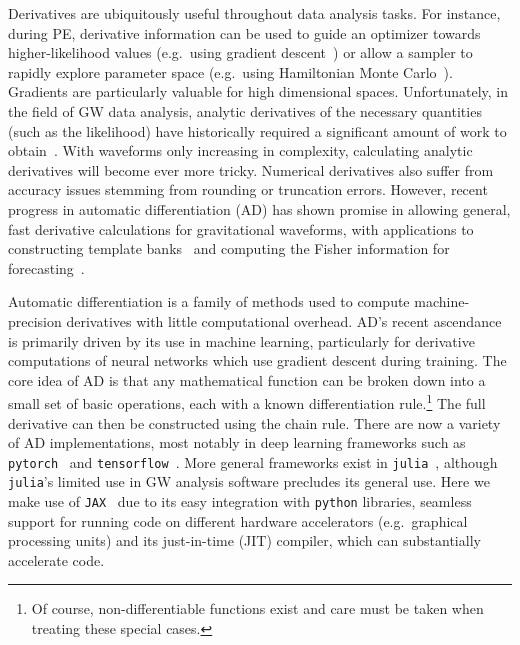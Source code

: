 \documentclass[twocolumn]{aastex631}
\newcommand{\jax}{\texttt{JAX}\xspace}
\newcommand{\kw}[1]{{\color{rb4}[KW: #1 ]}}
\newcommand{\dfm}[1]{{\color{dfm}[DFM: #1]}}
\begin{document}
Derivatives are ubiquitously useful throughout data analysis tasks.
For instance, during PE, derivative information can be used to guide an optimizer towards higher-likelihood values (e.g.\ using gradient descent~\citep{2016arXiv160904747R}) or allow a sampler to rapidly explore parameter space (e.g.\ using Hamiltonian Monte Carlo~\citep{2011hmcm.book..113N,2017arXiv170102434B}).
Gradients are particularly valuable for high dimensional spaces.
Unfortunately, in the field of GW data analysis, analytic derivatives of the necessary quantities (such as the likelihood) have historically required a significant amount of work to obtain~\citep{Keppel:2013kia}.
With waveforms only increasing in complexity, calculating analytic derivatives will become ever more tricky.
Numerical derivatives also suffer from accuracy issues stemming from rounding or truncation errors.
However, recent progress in automatic differentiation (AD) has shown promise in allowing general, fast derivative calculations for gravitational waveforms, with applications to constructing template banks~\citep{Coogan:2022qxs} and computing the Fisher information for forecasting~\citep{Iacovelli:2022bbs, Iacovelli:2022mbg}.


Automatic differentiation is a family of methods used to compute machine-precision derivatives with little computational overhead. 
AD's recent ascendance is primarily driven by its use in machine learning, particularly for derivative computations of neural networks which use gradient descent during training.
The core idea of AD is that any mathematical function can be broken down into a small set of basic operations, each with a known differentiation rule.\footnote{
    Of course, non-differentiable functions exist and care must be taken when treating these special cases.
    }
The full derivative can then be constructed using the chain rule.
There are now a variety of AD implementations, most notably in deep learning frameworks such as \texttt{pytorch}~\citep{pytorch} and \texttt{tensorflow}~\citep{tensorflow2015-whitepaper}.
More general frameworks exist in \texttt{julia}~\citep{zygote, forwarddiff}, although \texttt{julia}'s limited use in GW analysis software precludes its general use.
Here we make use of \jax~\citep{jax2018github} due to its easy integration with \texttt{python} libraries, seamless support for running code on different hardware accelerators (e.g.\ graphical processing units) and its just-in-time (JIT) compiler, which can substantially accelerate code.
\end{document}
